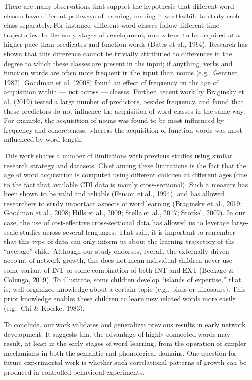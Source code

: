 \documentclass[english,,man,floatsintext]{apa6}
\begin{document}
There are many observations that support the hypothesis that different word classes have different pathways of learning, making it worthwhile to study each class separately. For instance, different word classes follow different time trajectories: In the early stages of development, nouns tend to be acquired at a higher pace than predicates and function words (Bates et al., 1994). Research has shown that this difference cannot be trivially attributed to differences in the degree to which these classes are present in the input; if anything, verbs and function words are often more frequent in the input than nouns (e.g., Gentner, 1982). Goodman et al. (2008) found an effect of frequency on the age of acquisition within --- not across --- classes. Further, recent work by Braginsky et al. (2019) tested a large number of predictors, besides frequency, and found that these predictors do not influence the acquisition of word classes in the same way. For example, the acquisition of nouns was found to be most influenced by frequency and concreteness, whereas the acquisition of function words was most influenced by word length.

This work shares a number of limitations with previous studies using similar research strategy and datasets. Chief among these limitations is the fact that the age of word acquisition is computed using different children at different ages (due to the fact that available CDI data is mainly cross-sectional). Such a measure has been shown to be valid and reliable (Fenson et al., 1994), and has allowed researchers to study important aspects of word learning (Braginsky et al., 2019; Goodman et al., 2008; Hills et al., 2009; Stella et al., 2017; Storkel, 2009). In our case, the use of cost-effective cross-sectional data has allowed us to leverage large-scale studies across several languages. That said, it is important to remember that this type of data can only inform us about the learning trajectory of the \enquote{average} child. Although our study endorses, overall, the externally-driven account of network growth, this does not mean individual children never use some variant of INT or some combination of both INT and EXT (Beckage \& Colunga, 2019). To illustrate, some children develop \enquote{islands of expertise,} that is, well-organized knowledge about a certain topic (e.g., birds or dinosaurs). This prior knowledge enables these children to learn new related words more easily (e.g., Chi \& Koeske, 1983).

To conclude, our work validates and generalizes previous results in early network development. It suggests that the advantage of highly connected words may result, at least in the early stages of word learning, from the operation of simpler mechanisms in both the semantic and phonological domains. One question for future experimental work is whether such correlational patterns of growth can be produced in controlled behavioral experiments.
\end{document}
